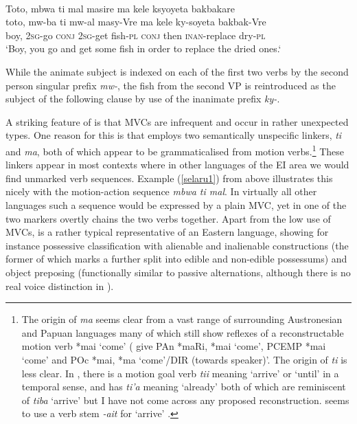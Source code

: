 \ea \label{selaru1}
\\
\glll Toto, mbwa ti mal masire ma kele ksyoyeta bakbakare\\
toto, mw-ba ti mw-al masy-Vre ma kele ky-soyeta bakbak-Vre\\
boy, \textsc{2}\textsc{sg}-go \textsc{conj} \textsc{2}\textsc{sg}-get fish-\textsc{pl} \textsc{conj} then \textsc{inan}-replace dry-\textsc{pl} \\
\glft `Boy, you go and get some fish in order to replace the dried ones.‘
\z

\largerpage[1]
While the animate subject is indexed on each of the first two verbs by the second person singular prefix \textit{mw-}, the fish from the second VP is reintroduced as the subject of the following clause by use of the inanimate prefix \textit{ky-}. 

A striking feature of  is that MVCs are infrequent and occur in rather unexpected types. One reason for this is that  employs two semantically unspecific linkers, \textit{ti} and \textit{ma}, both of which appear to be grammaticalised from motion verbs.\footnote{The origin of \textit{ma} seems clear from a vast range of surrounding Austronesian and Papuan languages many of which still show reflexes of a reconstructable motion verb *mai `come' (\citealt{ross2008lexicon} give PAn *maRi, *mai `come', PCEMP *mai `come' and POc *mai, *ma `come'/DIR (towards speaker)'. The origin of \textit{ti} is less clear. In , there is a motion goal verb \textit{tii} meaning `arrive' or `until' in a temporal sense, and  has \textit{ti'a} meaning `already' both of which are reminiscent of  \textit{tiba} `arrive' but I have not come across any proposed reconstruction.  seems to use a verb stem \textit{-ait} for `arrive' \citep[175]{coward2005}.} These linkers appear in most contexts where in other languages of the EI area we would find unmarked verb sequences. Example (\ref{selaru1}) from above illustrates this nicely with the motion-action sequence \textit{mbwa ti mal}. In virtually all other languages such a sequence would be expressed by a plain MVC, yet in  one of the two markers overtly chains the two verbs together. Apart from the low use of MVCs,  is a rather typical representative of an Eastern  language, showing for instance possessive classification with alienable and inalienable constructions (the former of which marks a further split into edible and non-edible possessums) and object preposing (functionally similar to passive alternations, although there is no real voice distinction in ). 

